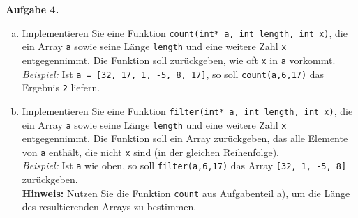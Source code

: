 \newpage
\textbf{Aufgabe 4.}
\begin{enumerate}[a)]
	\item Implementieren Sie eine Funktion \texttt{count(int* a, int length, int x)}, die ein Array \texttt{a} sowie seine Länge \texttt{length} und eine weitere Zahl \texttt{x} entgegennimmt.
	Die Funktion soll zurückgeben, wie oft \texttt{x} in \texttt{a} vorkommt. \\
	\textit{Beispiel:} Ist \texttt{a = [32, 17, 1, -5, 8, 17]}, so soll \texttt{count(a,6,17)} das Ergebnis \texttt{2} liefern.
	\item Implementieren Sie eine Funktion \texttt{filter(int* a, int length, int x)}, die ein Array \texttt{a} sowie seine Länge \texttt{length} und eine weitere Zahl \texttt{x} entgegennimmt.
	Die Funktion soll ein Array zurückgeben, das alle Elemente von \texttt{a} enthält, die nicht \texttt{x} sind (in der gleichen Reihenfolge). \\
	\textit{Beispiel:} Ist \texttt{a} wie oben, so soll \texttt{filter(a,6,17)} das Array \texttt{[32, 1, -5, 8]} zurückgeben. \\
	\textbf{Hinweis:} Nutzen Sie die Funktion \texttt{count} aus Aufgabenteil a), um die Länge des resultierenden Arrays zu bestimmen.
\end{enumerate}
